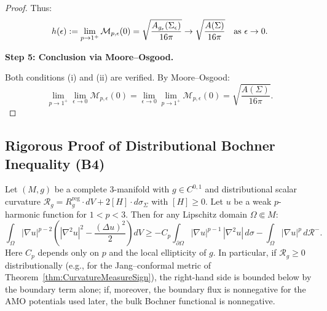 \begin{proof}
Thus:
\begin{equation}
    h(\epsilon) := \lim_{p \to 1^+} \mathcal{M}_{p,\epsilon}(0) = \sqrt{\frac{A_{g_{\epsilon}}(\Sigma_\epsilon)}{16\pi}} \to \sqrt{\frac{A(\Sigma)}{16\pi}} \quad \text{as } \epsilon \to 0.
\end{equation}

\textbf{Step 5: Conclusion via Moore--Osgood.}

Both conditions (i) and (ii) are verified. By Moore--Osgood:
\begin{equation}
    \lim_{p \to 1^+} \lim_{\epsilon \to 0} \mathcal{M}_{p,\epsilon}(0) = \lim_{\epsilon \to 0} \lim_{p \to 1^+} \mathcal{M}_{p,\epsilon}(0) = \sqrt{\frac{A(\Sigma)}{16\pi}}.
\end{equation}
\end{proof}

\subsection{Rigorous Proof of Distributional Bochner Inequality (B4)}

\begin{theorem}\label{thm:DistrBochnerComplete}
Let $(M, g)$ be a complete 3-manifold with $g \in C^{0,1}$ and distributional scalar curvature $\mathcal{R}_g = R_g^{\text{reg}} \cdot dV + 2[H] \cdot d\sigma_\Sigma$ with $[H] \ge 0$. Let $u$ be a weak $p$-harmonic function for $1 < p < 3$. Then for any Lipschitz domain $\Omega \Subset M$:
\begin{equation}\label{eq:DistrBochnerFinal}
    \int_\Omega |\nabla u|^{p-2} \left( |\nabla^2 u|^2 - \frac{(\Delta u)^2}{2} \right) dV \ge -C_p \int_{\partial\Omega} |\nabla u|^{p-1}\,|\nabla^2 u|\, d\sigma - \int_\Omega |\nabla u|^p \, d\mathcal{R}^-.
\end{equation}
Here $C_p$ depends only on $p$ and the local ellipticity of $g$. In particular, if $\mathcal{R}_g \ge 0$ distributionally (e.g., for the Jang--conformal metric of Theorem~\ref{thm:CurvatureMeasureSign}), the right-hand side is bounded below by the boundary term alone; if, moreover, the boundary flux is nonnegative for the AMO potentials used later, the bulk Bochner functional is nonnegative.
\end{theorem}

